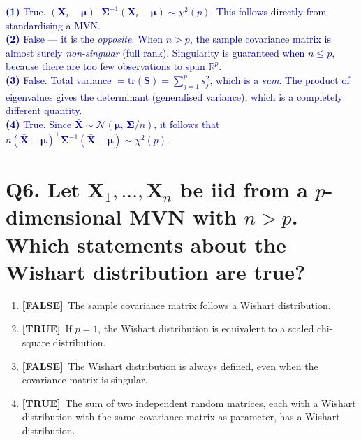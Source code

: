 \documentclass[12pt, a4paper]{article}
\newcommand{\T}{\textcolor{truegreen}{\textbf{[TRUE]}}}
\newcommand{\F}{\textcolor{falsered}{\textbf{[FALSE]}}}
\newcommand{\expl}[1]{\textcolor{darkblue}{\small #1}}
\begin{document}
\expl{
\textbf{(1)} True. $(\mathbf{X}_i - \boldsymbol{\mu})^\top \boldsymbol{\Sigma}^{-1} (\mathbf{X}_i - \boldsymbol{\mu}) \sim \chi^2(p)$. This follows directly from standardising a MVN.\\
\textbf{(2)} False --- it is the \textit{opposite}. When $n > p$, the sample covariance matrix is almost surely \textit{non-singular} (full rank). Singularity is guaranteed when $n \leq p$, because there are too few observations to span $\mathbb{R}^p$.\\
\textbf{(3)} False. Total variance $= \mathrm{tr}(\mathbf{S}) = \sum_{j=1}^p s_j^2$, which is a \textit{sum}. The product of eigenvalues gives the determinant (generalised variance), which is a completely different quantity.\\
\textbf{(4)} True. Since $\bar{\mathbf{X}} \sim \mathcal{N}(\boldsymbol{\mu},\, \boldsymbol{\Sigma}/n)$, it follows that $n(\bar{\mathbf{X}} - \boldsymbol{\mu})^\top \boldsymbol{\Sigma}^{-1} (\bar{\mathbf{X}} - \boldsymbol{\mu}) \sim \chi^2(p)$.
}

\vspace{1.5em}

\section*{Q6. Let $\mathbf{X}_1, \ldots, \mathbf{X}_n$ be iid from a $p$-dimensional MVN with $n > p$. Which statements about the Wishart distribution are true?}

\begin{enumerate}[label=(\arabic*)]
  \item \F\ The sample covariance matrix follows a Wishart distribution.
  \item \T\ If $p = 1$, the Wishart distribution is equivalent to a scaled chi-square distribution.
  \item \F\ The Wishart distribution is always defined, even when the covariance matrix is singular.
  \item \T\ The sum of two independent random matrices, each with a Wishart distribution with the same covariance matrix as parameter, has a Wishart distribution.
\end{enumerate}
\end{document}
